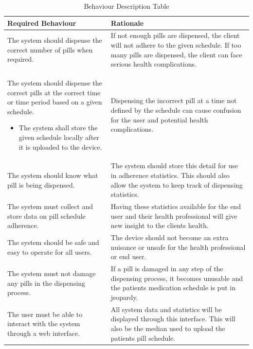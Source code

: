 \documentclass[12pt,titlepage]{article}
\begin{document}
\begin{table}[ht!]
\begin{center}
\begin{adjustbox}{max width=\textwidth}
\small
\begin{tabular}{|p{}|p{}|}
 \hline
 \textbf{Required Behaviour} & \textbf{Rationale} \\
 \hline 
 The system should dispense the correct number of pills when required. & 
  If not enough pills are dispensed, the client will not adhere to the given schedule. If too many pills are dispensed, the client can face serious health complications. \\
 \hline
 The system should dispense the correct pills at the correct time or time period based on a given schedule.
 \begin{itemize}
     \item The system shall store the given schedule locally after it is uploaded to the device.
 \end{itemize} &

 Dispensing the incorrect pill at a time not defined by the schedule can cause confusion for the user and potential health complications.\\
 \hline
 The system should know what pill is being dispensed. &
 The system should store this detail for use in adherence statistics. This should also allow the system to keep track of dispensing statistics.\\
 \hline
 The system must collect and store data on pill schedule adherence. & 
 Having these statistics available for the end user and their health professional will give new insight to the clients health.\\
 \hline
 The system should be safe and easy to operate for all users. &
 The device should not become an extra nuisance or unsafe for the health professional or end user. \\
 \hline
 The system must not damage any pills in the dispensing process. &
 If a pill is damaged in any step of the dispensing process, it becomes unusable and the patients medication schedule is put in jeopardy.\\
 \hline
 The user must be able to interact with the system through a web interface. &
 All system data and statistics will be displayed through this interface. This will also be the median used to upload the patients pill schedule. \\
 \hline
 
\end{tabular}
\end{adjustbox}
\end{center}
\caption{Behaviour Description Table}
\end{table}
\end{document}
